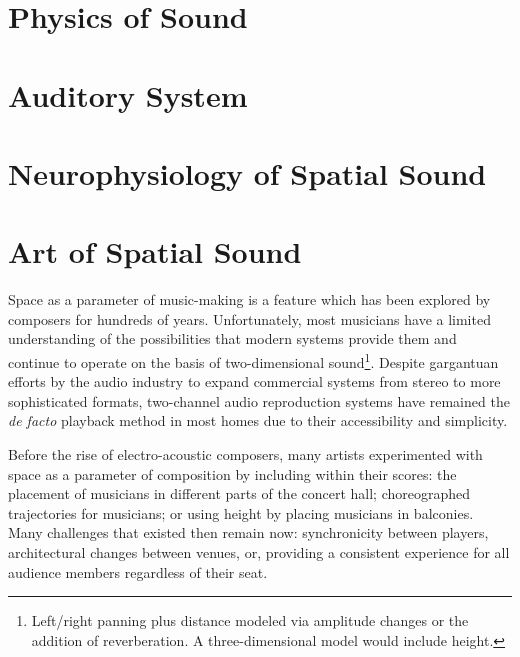 \section{Physics of Sound}


\section{Auditory System}


\section{Neurophysiology of Spatial Sound}


\section{Art of Spatial Sound}

Space as a parameter of music-making is a feature which has been explored by composers for hundreds of years. Unfortunately, most musicians have a limited understanding of the possibilities that modern systems provide them and continue to operate on the basis of two-dimensional sound\footnote{Left/right panning plus distance modeled via amplitude changes or the addition of reverberation. A three-dimensional model would include height.}. Despite gargantuan efforts by the audio industry to expand commercial systems from stereo to more sophisticated formats, two-channel audio reproduction systems have remained the \textit{de facto} playback method in most homes due to their accessibility and simplicity. 

Before the rise of electro-acoustic composers, many artists experimented with space as a parameter of composition by including within their scores: the placement of musicians in different parts of the concert hall; choreographed trajectories for musicians; or using height by placing musicians in balconies. Many challenges that existed then remain now: synchronicity between players, architectural changes between venues, or, providing a consistent experience for all audience members regardless of their seat. 

